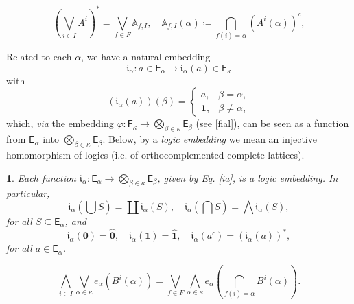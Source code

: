 \documentclass[10pt,a4paper]{amsart}
\newtheorem{prop}{}
\begin{document}
\begin{equation}
{\textstyle \left(\bigvee_{i\in I}A^{i}\right)^{*}={\textstyle \bigvee_{f\in F}}\mathbb{A}_{f,I}},\quad\mathbb{A}_{f,I}\left(\alpha\right)\coloneqq{\textstyle \bigcap_{f\left(i\right)=\alpha}}\left(A^{i}\left(\alpha\right)\right)^{c},\label{fc}
\end{equation}

Related to each $\alpha$, we have a natural embedding
\[
\mathfrak{i}_{\alpha}:a\in\mathsf{E}_{\alpha}\longmapsto\mathfrak{i}_{\alpha}\left(a\right)\in\mathsf{F}_{\kappa}
\]
with
\begin{equation}
\left(\mathfrak{i}_{\alpha}\left(a\right)\right)\left(\beta\right)=\begin{cases}
a, & \beta=\alpha,\\
\mathbf{1}, & \beta\neq\alpha,
\end{cases}\label{ia}
\end{equation}
which, \textit{via} the embedding $\varphi:\mathsf{F}_{\kappa}\rightarrow{\textstyle \bigotimes_{\beta\in\kappa}}\mathsf{E}_{\beta}$
(see \eqref{fial}), can be seen as a function from $\mathsf{E}_{\alpha}$
into ${\textstyle \bigotimes_{\beta\in\kappa}}\mathsf{E}_{\beta}$.
Below, by a \textit{logic embedding} we mean an injective homomorphism
of logics (i.e. of orthocomplemented complete lattices).
\begin{prop}
Each function $\mathfrak{i}_{\alpha}:\mathsf{E}_{\alpha}\rightarrow{\textstyle \bigotimes_{\beta\in\kappa}}\mathsf{E}_{\beta}$,
given by Eq. \eqref{ia}, is a logic embedding. In particular,
\[
\mathfrak{i}_{\alpha}\left(\bigcup S\right)=\coprod\mathfrak{i}_{\alpha}\left(S\right),\quad\mathfrak{i}_{\alpha}\left(\bigcap S\right)=\bigwedge\mathfrak{i}_{\alpha}\left(S\right),
\]
for all $S\subseteq\mathsf{E}_{\alpha}$, and 
\[
\mathfrak{i}_{\alpha}\left(\mathbf{0}\right)=\hat{\mathbf{0}},\quad\mathfrak{i}_{\alpha}\left(\mathbf{1}\right)=\hat{\mathbf{1}},\quad\mathfrak{i}_{\alpha}\left(a^{c}\right)=\left(\mathfrak{i}_{\alpha}\left(a\right)\right)^{*},
\]
for all $a\in\mathsf{E}_{\alpha}$.
\end{prop}

\begin{equation}
{\textstyle \bigwedge_{i\in I}\bigvee_{\alpha\in\kappa}}e_{\alpha}\left(B^{i}\left(\alpha\right)\right)={\textstyle \bigvee_{f\in F}\bigwedge_{\alpha\in\kappa}}e_{\alpha}\left({\textstyle \bigcap_{f\left(i\right)=\alpha}}B^{i}\left(\alpha\right)\right).\label{edb}
\end{equation}
\end{document}
